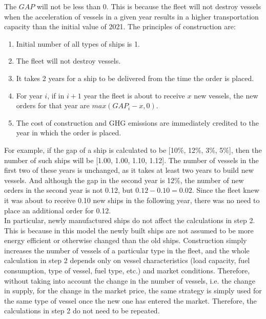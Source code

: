 \documentclass[a4paper,12pt]{article}
\begin{document}
The $GAP$ will not be less than 0.
This is because the fleet will not destroy vessels when the acceleration of vessels in a given year results in a higher transportation capacity than the initial value of 2021.
The principles of construction are:
\begin{enumerate}
	\item Initial number of all types of ships is 1.
	\item The fleet will not destroy vessels.
	\item It takes 2 years for a ship to be delivered from the time the order is placed.
	\item For year $i$, if in $i+1$ year the fleet is about to receive $x$ new vessels, the new orders for that year are $max(GAP_i - x, 0)$.
	\item The cost of construction and GHG emissions are immediately credited to the year in which the order is placed.
\end{enumerate}


For example, if the gap of a ship is calculated to be [10\%, 12\%, 3\%, 5\%], then the number of such ships will be [1.00, 1.00, 1.10, 1.12].
The number of vessels in the first two of these years is unchanged, as it takes at least two years to build new vessels.
And although the gap in the second year is 12\%, the number of new orders in the second year is not 0.12, but $0.12-0.10=0.02$.
Since the fleet knew it was about to receive 0.10 new ships in the following year, there was no need to place an additional order for 0.12.\\

In particular, newly manufactured ships do not affect the calculations in step 2.
This is because in this model the newly built ships are not assumed to be more energy efficient or otherwise changed than the old ships.
Construction simply increases the number of vessels of a particular type in the fleet, and the whole calculation in step 2 depends only on vessel characteristics (load capacity, fuel consumption, type of vessel, fuel type, etc.) and market conditions.
Therefore, without taking into account the change in the number of vessels, i.e. the change in supply, for the change in the market price, the same strategy is simply used for the same type of vessel once the new one has entered the market.
Therefore, the calculations in step 2 do not need to be repeated.
\end{document}
